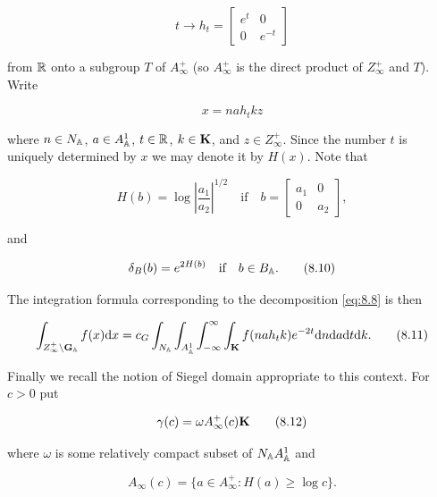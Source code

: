 \[
t \to h_{t} = \begin{bmatrix} e^{t} & 0 \\ 0 & e^{-t} \end{bmatrix}
\]

from $\mathbb{R}$ onto a subgroup $T$ of $A_{\infty}^{+}$ (so $A_{\infty}^{+}$ is the direct product of $Z_{\infty}^{+}$ and $T$). Write

\begin{equation}\label{eq:8.8}
x = na h_{t} k z\tag{8.8}
\end{equation}

where $n \in N_{\mathbb{A}}$, $a \in A_{\mathbb{A}}^{1}$, $t \in \mathbb{R}$, $k \in \mathbf{K}$, and $z \in Z_{\infty}^{+}$. Since the number $t$ is uniquely determined by $x$ we may denote it by $H(x)$. Note that

\begin{equation}\label{eq:8.9}
H(b) = \log \left|\frac{a_{1}}{a_{2}}\right|^{1/2} \quad \text{if} \quad b = \begin{bmatrix} a_{1} & 0 \\ 0 & a_{2} \end{bmatrix},\tag{8.9}
\end{equation}

and

\begin{equation}\label{eq:8.10}
\delta_{B}(b) = e^{2H(b)} \quad \text{if} \quad b \in B_{\mathbb{A}}.\tag{8.10}
\end{equation}

The integration formula corresponding to the decomposition \eqref{eq:8.8} is then

\begin{equation}\label{eq:8.11}
\int_{Z_{\infty}^{+}\backslash \mathbf{G}_{\mathbb{A}}} f(x) \mathrm{d} x = c_{G} \int_{N_{\mathbb{A}}} \int_{A_{\mathbb{A}}^{1}} \int_{-\infty}^{\infty} \int_{\mathbf{K}} f(na h_{t} k) e^{-2t} \mathrm{d} n \mathrm{d} a \mathrm{d} t \mathrm{d} k.\tag{8.11}
\end{equation}

Finally we recall the notion of Siegel domain appropriate to this context. For $c > 0$ put

\begin{equation}\label{eq:8.12}
\gamma(c) = \omega A_{\infty}^{+}(c)\mathbf{K}\tag{8.12}
\end{equation}

where $\omega$ is some relatively compact subset of $N_{\mathbb{A}}A_{\mathbb{A}}^{1}$ and

\begin{equation}\label{eq:8.13}
A_{\infty}(c) = \{a \in A_{\infty}^{+}: H(a) \geq \log c\}.\tag{8.13}
\end{equation}

